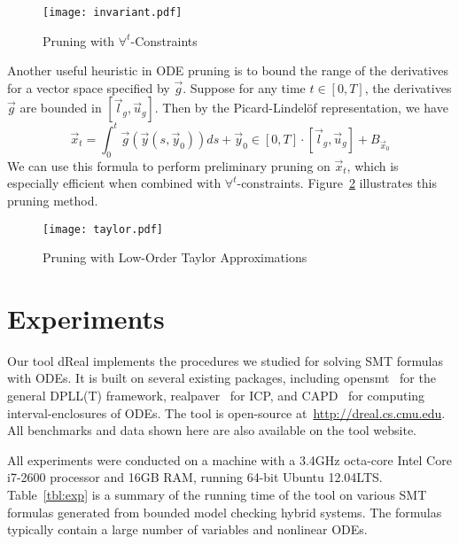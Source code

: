 \documentclass[11pt]{article}
\begin{document}
\begin{figure}
\begin{center}
\texttt{[image: invariant.pdf]}
\end{center}
\caption{Pruning with $\forall^t$-Constraints}\label{inv}
\end{figure}
Another useful heuristic in ODE pruning is to bound the range of the derivatives for a vector space specified by $\vec g$. Suppose for any time $t\in[0,T]$, the derivatives $\vec g$ are bounded in $[\vec l_g, \vec u_g]$. Then by the Picard-Lindel\"of representation, we have
$$\vec x_t = \int_{0}^t \vec g(\vec y(s,\vec y_0))ds + \vec y_0\in [0, T]\cdot [\vec l_g, \vec u_g]+B_{\vec x_0}$$
We can use this formula to perform preliminary pruning on $\vec x_t$, which is especially efficient when combined with $\forall^t$-constraints. Figure~\ref{taylor} illustrates this pruning method.
\begin{figure}
\begin{center}
\texttt{[image: taylor.pdf]}
\end{center}
\caption{Pruning with Low-Order Taylor Approximations}\label{taylor}
\end{figure}

\section{Experiments}\label{experiments}

Our tool {\sf dReal} implements the procedures we studied for solving SMT formulas with ODEs. It is built on several existing packages, including {\sf opensmt}~\cite{DBLP:conf/tacas/BruttomessoPST10} for the general DPLL(T) framework, {\sf realpaver}~\cite{DBLP:journals/toms/GranvilliersB06} for ICP, and {\sf CAPD}~\cite{capd} for computing interval-enclosures of ODEs. The tool is open-source at~\url{http://dreal.cs.cmu.edu}.  All benchmarks and data shown here are also available on the tool website.


All experiments were conducted on a machine with a 3.4GHz octa-core Intel Core i7-2600 processor and 16GB RAM, running 64-bit Ubuntu 12.04LTS. Table~\ref{tbl:exp} is a summary of the running time of the tool on various SMT formulas generated from bounded model checking hybrid systems. The formulas typically contain a large number of variables and nonlinear ODEs. 
\end{document}
